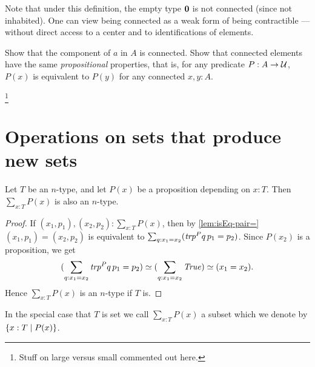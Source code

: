 Note that under this definition, the empty type $\mathbf{0}$ is not connected
(since not inhabited). One can view being connected as a weak form
of being contractible --- without direct access to a center and to
identifications of elements.

\begin{xca}\label{xca:component-connected}
Show that the component of $a$ in $A$ is connected.
Show that connected elements have the same 
\emph{propositional} properties, that is, 
for any predicate $P:A\to\mathcal{U}$, $P(x)$ is equivalent
to $P(y)$ for any connected $x,y:A$. 
\end{xca}
\footnote{Stuff on large versus small commented out here.}


\section{Operations on sets that produce new sets}
\label{sec:operations-on-sets}

\begin{lemma}\label{lem:subtype}
Let $T$ be an $n$-type, and let $P(x)$ be a proposition depending on $x:T$. 
Then $\sum_{x:T} P(x)$ is also an $n$-type.
\end{lemma}

\begin{proof}
If $(x_1,p_1),(x_2,p_2) : \sum_{x:T} P(x)$, then by \cref{lem:isEq-pair=}
$(x_1,p_1)=(x_2,p_2)$ is equivalent to 
$\sum_{q:x_1=x_2} ({\mathord{\mathit{trp}}}^P q\,p_1 = p_2)$. 
Since $P(x_2)$ is a proposition, we get 
\[
(\sum_{q:x_1=x_2} {\mathord{\mathit{trp}}}^P q\,p_1 = p_2) \simeq 
(\sum_{q:x_1=x_2} \mathop{\mathit{True}}) \simeq (x_1=x_2).
\]
Hence $\sum_{x:T} P(x)$ is an $n$-type if $T$ is.
\end{proof}
In the special case that $T$ is set we call 
$\sum_{x:T} P(x)$ a subset which we denote by 
$\{x:T \mid P(x)\}$.


